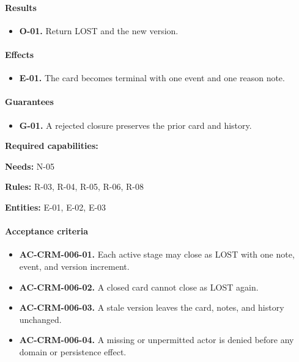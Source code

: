 \documentclass[10pt,a4paper]{article}
\begin{document}
\paragraph{Results}

\begin{itemize}

\item \textbf{O-01.} Return LOST and the new version.

\end{itemize}

\paragraph{Effects}

\begin{itemize}

\item \textbf{E-01.} The card becomes terminal with one event and one reason note.

\end{itemize}

\paragraph{Guarantees}

\begin{itemize}

\item \textbf{G-01.} A rejected closure preserves the prior card and history.

\end{itemize}

\textbf{Required capabilities:}

\textbf{Needs:} N-05

\textbf{Rules:} R-03, R-04, R-05, R-06, R-08

\textbf{Entities:} E-01, E-02, E-03

\paragraph{Acceptance criteria}

\begin{itemize}

\item \textbf{AC-CRM-006-01.} Each active stage may close as LOST with one note, event, and version increment.

\item \textbf{AC-CRM-006-02.} A closed card cannot close as LOST again.

\item \textbf{AC-CRM-006-03.} A stale version leaves the card, notes, and history unchanged.

\item \textbf{AC-CRM-006-04.} A missing or unpermitted actor is denied before any domain or persistence effect.

\end{itemize}
\end{document}
